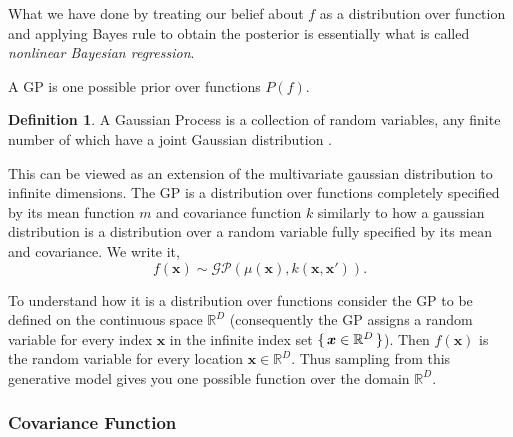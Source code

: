 \documentclass[conference,compsoc]{IEEEtran}
\theoremstyle{definition}
\newtheorem{definition}{Definition}[section]
\begin{document}

        What we have done by treating our belief about $f$ as a distribution over function and applying Bayes rule to obtain the posterior is essentially what is called \emph{nonlinear Bayesian regression}.

        A GP is one possible prior over functions $P(f)$.

        \begin{definition}{A Gaussian Process}
            is a collection of random variables, any finite number of which have a joint Gaussian distribution \parencite{rasmussen_gaussian_2006}.
        \end{definition}
            
        This can be viewed as an extension of the multivariate gaussian distribution to infinite dimensions.
        The GP is a distribution over functions completely specified by its mean function $m$ and covariance function $k$ similarly to how a gaussian distribution is a distribution over a random variable fully specified by its mean and covariance.
        We write it,
            \begin{equation}
                f(\bm{x}) \sim \mathcal{GP}(\mu(\bm{x}), k(\bm{x}, \bm{x}')).
            \end{equation}

        To understand how it is a distribution over functions consider the GP to be defined on the continuous space $\mathbb{R}^D$ (consequently the GP assigns a random variable for every index $\bm{x}$ in the infinite index set $\set{\bm{x} \in \mathbb{R}^D}$).
        Then $f(\bm{x})$ is the random variable for every location $\bm{x} \in \mathbb{R}^D$.
        Thus sampling from this generative model gives you one possible function over the domain $\mathbb{R}^D$.


        \subsubsection{Covariance Function}\label{sec:covar}
\end{document}
